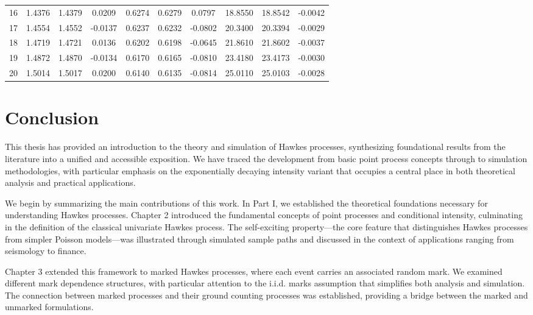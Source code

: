 \documentclass[12pt,a4paper]{report}
\theoremstyle{plain}
\theoremstyle{definition}
\theoremstyle{remark}
\newcommand{\1}{\mathbf{1}}
\begin{document}
\begin{table}[H]
\begin{tabular}{c|ccc|ccc|ccc}
16 & 1.4376 & 1.4379 & 0.0209  & 0.6274 & 0.6279 & 0.0797  & 18.8550& 18.8542& -0.0042 \\
17 & 1.4554 & 1.4552 & -0.0137 & 0.6237 & 0.6232 & -0.0802 & 20.3400& 20.3394& -0.0029 \\
18 & 1.4719 & 1.4721 & 0.0136  & 0.6202 & 0.6198 & -0.0645 & 21.8610& 21.8602& -0.0037 \\
19 & 1.4872 & 1.4870 & -0.0134 & 0.6170 & 0.6165 & -0.0810 & 23.4180& 23.4173& -0.0030 \\
20 & 1.5014 & 1.5017 & 0.0200  & 0.6140 & 0.6135 & -0.0814 & 25.0110& 25.0103& -0.0028 \\
\hline
\end{tabular}
\end{table}

\chapter{Conclusion}\label{chap:8}
This thesis has provided an introduction to the theory and simulation of Hawkes processes, synthesizing foundational results from the literature into a unified and accessible exposition. We have traced the development from basic point process concepts through to simulation methodologies, with particular emphasis on the exponentially decaying intensity variant that occupies a central place in both theoretical analysis and practical applications.

\medskip
\medskip
\noindent
We begin by summarizing the main contributions of this work. In Part I, we established the theoretical foundations necessary for understanding Hawkes processes. Chapter 2 introduced the fundamental concepts of point processes and conditional intensity, culminating in the definition of the classical univariate Hawkes process. The self-exciting property---the core feature that distinguishes Hawkes processes from simpler Poisson models---was illustrated through simulated sample paths and discussed in the context of applications ranging from seismology to finance.

\medskip
\noindent
Chapter 3 extended this framework to marked Hawkes processes, where each event carries an associated random mark. We examined different mark dependence structures, with particular attention to the i.i.d. marks assumption that simplifies both analysis and simulation. The connection between marked processes and their ground counting processes was established, providing a bridge between the marked and unmarked formulations.
\end{document}

